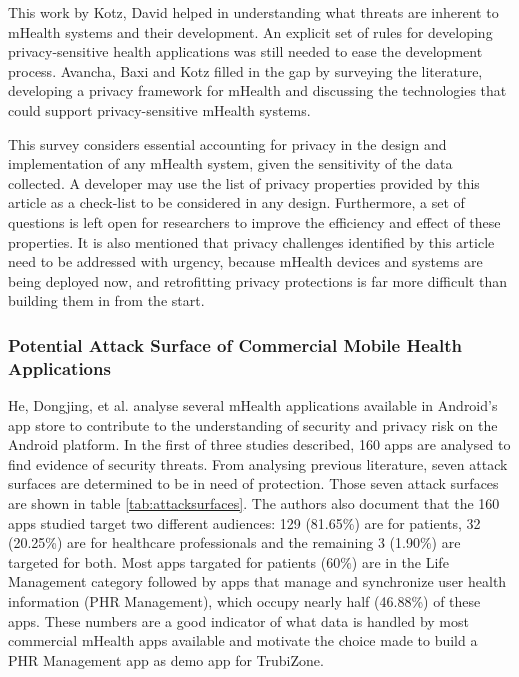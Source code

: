 This work by Kotz, David \cite{kotz2011threat} helped in understanding what threats are inherent to mHealth systems and their development. An explicit set of rules for developing privacy-sensitive health applications was still needed to ease the development process. Avancha, Baxi and Kotz \cite{avancha2012privacy} filled in the gap by surveying the literature, developing a privacy framework for mHealth and discussing the technologies that could support privacy-sensitive mHealth systems.

This survey considers essential accounting for privacy in the design and implementation of any mHealth system, given the sensitivity of the data collected. A developer may use the list of privacy properties provided by this article as a check-list to be considered in any design. Furthermore, a set of questions is left open for researchers to improve the efficiency and effect of these properties. It is also mentioned that privacy challenges identified by this article need to be addressed with urgency, because mHealth devices and systems are being deployed now, and retrofitting privacy protections is far more difficult than building them in from the start.

 
\subsubsection{Potential Attack Surface of Commercial Mobile Health Applications}

He, Dongjing, et al. \cite{he2014security} analyse several mHealth applications available in Android's app store to contribute to the understanding of security and privacy risk on the Android platform. In the first of three studies described, 160 apps are analysed to find evidence of security threats. From analysing previous literature, seven attack surfaces are determined to be in need of protection. Those seven attack surfaces are shown in table \ref{tab:attacksurfaces}. The authors also document that the 160 apps studied target two different audiences: 129 (81.65\%) are for patients, 32 (20.25\%) are for healthcare professionals and the remaining 3 (1.90\%) are targeted for both. Most apps targated for patients (60\%) are in the Life Management category followed by apps that manage and synchronize user health information (\ac{PHR} Management), which occupy nearly half (46.88\%) of these apps. These numbers are a good indicator of what data is handled by most commercial mHealth apps available and motivate the choice made to build a \ac{PHR} Management app as demo app for TrubiZone.

